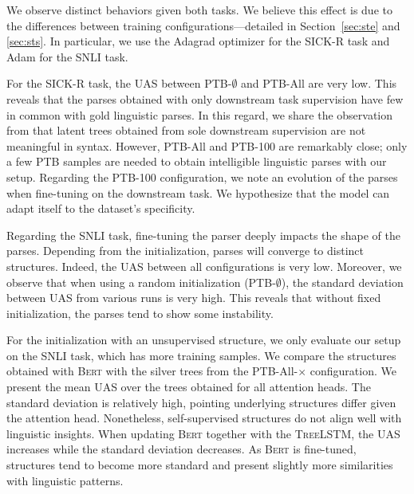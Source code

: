 We observe distinct behaviors given both tasks. We believe this effect is due to the differences between training configurations—detailed in Section~\ref{sec:ste} and \ref{sec:sts}. In particular, we use the Adagrad optimizer for the SICK-R task and Adam for the SNLI task.

For the SICK-R task, the UAS between PTB-$\emptyset$ and PTB-All are very low. This reveals that the parses obtained with only downstream task supervision have few in common with gold linguistic parses. In this regard, we share the observation from \textcite{williams_18} that latent trees obtained from sole downstream supervision are not meaningful in syntax. However, PTB-All and PTB-100 are remarkably close; only a few PTB samples are needed to obtain intelligible linguistic parses with our setup. Regarding the PTB-100 configuration, we note an evolution of the parses when fine-tuning on the downstream task. We hypothesize that the model can adapt itself to the dataset's specificity. 

Regarding the SNLI task, fine-tuning the parser deeply impacts the shape of the parses. Depending from the initialization, parses will converge to distinct structures. Indeed, the UAS between all configurations is very low. Moreover, we observe that when using a random initialization (PTB-$\emptyset$), the standard deviation between UAS from various runs is very high. This reveals that without fixed initialization, the parses tend to show some instability.

For the initialization with an unsupervised structure, we only evaluate our setup on the SNLI task, which has more training samples. We compare the structures obtained with \textsc{Bert} with the silver trees from the PTB-All-$\times$ configuration. We present the mean UAS over the trees obtained for all attention heads. The standard deviation is relatively high, pointing underlying structures differ given the attention head. Nonetheless, self-supervised structures do not align well with linguistic insights. When updating \textsc{Bert} together with the \textsc{TreeLSTM}, the UAS increases while the standard deviation decreases. As \textsc{Bert} is fine-tuned, structures tend to become more standard and present slightly more similarities with linguistic patterns.



